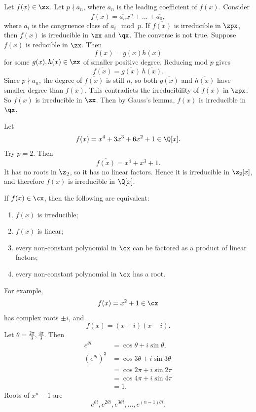 \begin{theorem}{
    Let $f(x)\in\zx$.
    Let $p\nmid a_n$, where $a_n$ is the leading coefficient of $f(x)$.
    Consider
    \[
        \overline{f(x)}=\overline{a_n}x^n+\hdots+\overline{a_0},
    \]
    where $\overline{a_i}$ is the congruence class of $a_i\mod p$.
    If $\overline{f(x)}$ is irreducible in $\zpx$, then $f(x)$ is irreducible in $\zx$ and $\qx$.
    The converse is not true.
}
Suppose $f(x)$ is reducible in $\zx$.
Then
\[
    f(x)=g(x)h(x)
\]
for some $g(x),h(x)\in\zx$ of smaller positive degree.
Reducing mod $p$ gives
\[
    \overline{f(x)}=\overline{g(x)}\,\overline{h(x)}.
\]
Since $p\nmid a_n$, the degree of $\overline{f(x)}$ is still $n$, so both $\overline{g(x)}$ and $\overline{h(x)}$ have smaller degree than $\overline{f(x)}$.
This contradicts the irreducibility of $\overline{f(x)}$ in $\zpx$.
So $f(x)$ is irreducible in $\zx$.
Then by Gauss's lemma, $f(x)$ is irreducible in $\qx$.
\end{theorem}

Let
\[
    f(x)=x^4+3x^3+6x^2+1\in\Q[x].
\]
Try $p=2$.
Then
\[
    \overline{f(x)}=x^4+x^3+1.
\]
It has no roots in $\z_2$, so it has no linear factors.
Hence it is irreducible in $\z_2[x]$, and therefore $f(x)$ is irreducible in $\Q[x]$.

\begin{theorem*}{
    If $f(x)\in\cx$, then the following are equivalent:
    \begin{enumerate}
        \item $f(x)$ is irreducible;
        \item $f(x)$ is linear;
        \item every non-constant polynomial in $\cx$ can be factored as a product of linear factors;
        \item every non-constant polynomial in $\cx$ has a root.
    \end{enumerate}
}
\end{theorem*}

For example,
\[
    f(x)=x^2+1\in\cx
\]
has complex roots $\pm i$, and
\[
    f(x)=(x+i)(x-i).
\]
Let $\theta=\frac{2\pi}{3},\frac{4\pi}{3}$.
Then
\begin{align*}
    e^{\theta i} &= \cos\theta+i\sin\theta,\\
    \left(e^{\theta i}\right)^3 &= \cos 3\theta+i\sin 3\theta\\
    &= \cos 2\pi+i\sin 2\pi\\
    &= \cos 4\pi+i\sin 4\pi\\
    &= 1.
\end{align*}
Roots of $x^n-1$ are
\[
    e^{\theta i},e^{2\theta i},e^{3\theta i},\hdots,e^{(n-1)\theta i}.
\]

